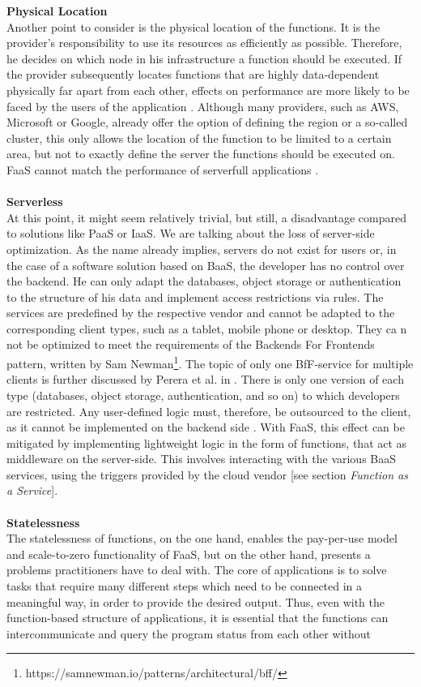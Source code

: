 \documentclass[a4paper,twoside,11pt, pagesize]{scrartcl}
\begin{document}
\begin{spacing}{1.2}
\textbf{Physical Location}\\ Another point to consider is the physical location of the functions. It is the provider's responsibility to use its resources as efficiently as possible. Therefore, he decides on which node in his infrastructure a function should be executed. If the provider subsequently locates functions that are highly data-dependent physically far apart from each other, effects on performance are more likely to be faced by the users of the application \cite{shafiei2020serverless}. Although many providers, such as AWS, Microsoft or Google, already offer the option of defining the region or a so-called cluster, this only allows the location of the function to be limited to a certain area, but not to exactly define the server the functions should be executed on. FaaS cannot match the performance of serverfull applications \cite{shafiei2020serverless}.\\\\ \textbf{Serverless}\\ At this point, it might seem relatively trivial, but still, a disadvantage compared to solutions like PaaS or IaaS. We are talking about the loss of server-side optimization. As the name already implies, servers do not exist for users or, in the case of a software solution based on BaaS, the developer has no control over the backend. He can only adapt the databases, object storage or authentication to the structure of his data and implement access restrictions via rules. The services are predefined by the respective vendor and cannot be adapted to the corresponding client types, such as a tablet, mobile phone or desktop. They ca n not be optimized to meet the requirements of the \glqq Backends For Frontends\grqq{} pattern, written by Sam Newman\footnote{https://samnewman.io/patterns/architectural/bff/}. The topic of only one BfF-service for multiple clients is further discussed by Perera et al. in \cite{perera2018rule}. There is only one version of each type (databases, object storage, authentication, and so on) to which developers are restricted. Any user-defined logic must, therefore, be outsourced to the client, as it cannot be implemented on the backend side \cite{fowler2018serverless}. With FaaS, this effect can be mitigated by implementing lightweight logic in the form of functions, that act as middleware on the server-side. This involves interacting with the various BaaS services, using the triggers provided by the cloud vendor [see section \textit{Function as a Service}].\\\\ \textbf{Statelessness}\\ The statelessness of functions, on the one hand, enables the pay-per-use model and scale-to-zero functionality of FaaS, but on the other hand, presents a problems practitioners have to deal with. The core of applications is to solve tasks that require many different steps which need to be connected in a meaningful way, in order to provide the desired output. Thus, even with the function-based structure of applications, it is essential that the functions can intercommunicate and query the program status from each other without 
\end{spacing}
\end{document}
